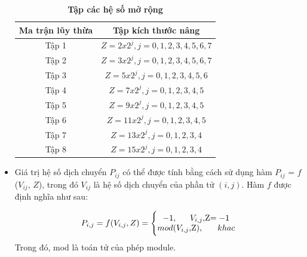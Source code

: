 \documentclass{article}
\begin{document}
\begin{itemize}
  \begin{table}[H]
    \centering
    \caption[Tập các hệ số mở rộng]{\bfseries Tập các hệ số mở rộng}
    \label{bang11}
    \begin{tabularx}{9.9cm} {|c|c|}
  \hline
  \textbf{Ma trận lũy thừa} & \textbf{Tập kích thước nâng}  \\ \hline
   Tập 1 & $Z = 2 x 2^j, j=0,1,2,3,4,5,6,7$  \\ \hline
   Tập 2 & $Z = 3 x 2^j, j=0,1,2,3,4,5,6,7$ \\ \hline
   Tập 3 & \hspace{-0.4cm} $Z = 5 x 2^j, j=0,1,2,3,4,5,6$  \\ \hline
   Tập 4 & \hspace{-0.7cm} $Z = 7 x 2^j, j=0,1,2,3,4,5$\\ \hline
   Tập 5 & \hspace{-0.8cm} $Z = 9 x 2^j, j=0,1,2,3,4,5$\\ \hline
   Tập 6 & \hspace{-0.6cm} $Z = 11 x 2^j, j=0,1,2,3,4,5$ \\ \hline
   Tập 7 & \hspace{-0.9cm} $Z = 13 x 2^j, j=0,1,2,3,4$  \\ \hline
   Tập 8 & \hspace{-0.9cm} $Z = 15 x 2^j, j=0,1,2,3,4$ \\\hline
     \end{tabularx}
  \end{table}
    
    \item Giá trị hệ số dịch chuyển $P_{ij}$  có thể được tính bằng cách sử dụng hàm  $P_{ij}$ = $f$($V_{ij}$, $Z$), trong đó $V_{ij}$ là hệ số dịch chuyển của phần tử $(i, j)$. Hàm $f$   được định nghĩa như sau:
    
    \begin{equation}\label{pt11}
    P_{i,j} = f(V_{i,j}, Z) =
    \Bigg \{ \begin{matrix}
        -1, \hspace{0.6cm}  $$V_{i,j}$$, $Z$ = -1 \\
        mod($$V_{i,j}$$, $Z$),    \hspace{0.6cm}  khac
    \end{matrix}
    \end{equation}
    Trong đó, mod là toán tử của phép module.
    \end{itemize}
\end{document}
